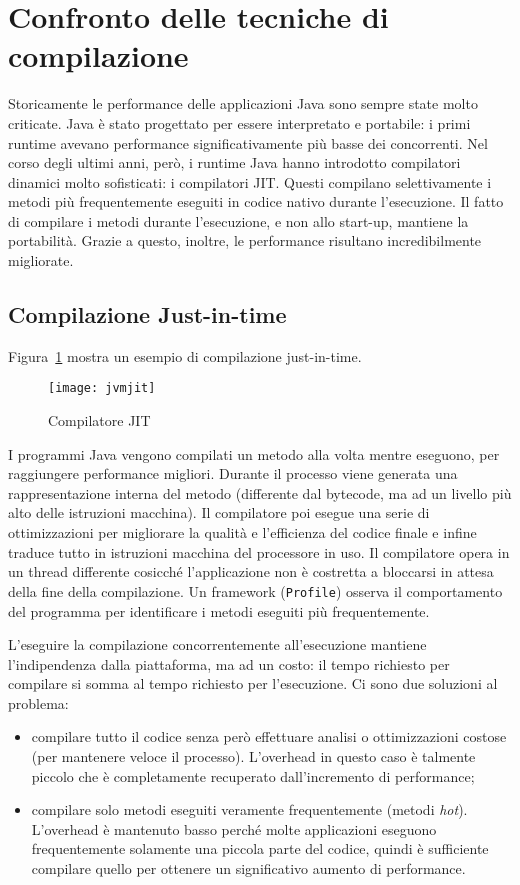 \section{Confronto delle tecniche di compilazione}
Storicamente le performance delle applicazioni Java sono sempre state molto criticate. Java è stato progettato per essere interpretato e portabile: i primi runtime avevano performance significativamente più basse dei concorrenti. Nel corso degli ultimi anni, però, i runtime Java hanno introdotto compilatori dinamici molto sofisticati: i compilatori JIT. Questi compilano selettivamente i metodi più frequentemente eseguiti in codice nativo durante l'esecuzione. Il fatto di compilare i metodi durante l'esecuzione, e non allo start-up, mantiene la portabilità. Grazie a questo, inoltre, le performance risultano incredibilmente migliorate. 

\subsection{Compilazione Just-in-time}
Figura~\ref{fig:jit} mostra un esempio di compilazione just-in-time. 
\begin{figure}[h]
	\centering
	\texttt{[image: jvmjit]}
	\caption[Compilatore JIT]{Compilatore JIT}
	\label{fig:jit}
\end{figure}
I programmi Java vengono compilati un metodo alla volta mentre eseguono, per raggiungere performance migliori. Durante il processo viene generata una rappresentazione interna del metodo (differente dal bytecode, ma ad un livello più alto delle istruzioni macchina). Il compilatore poi esegue una serie di ottimizzazioni per migliorare la qualità e l'efficienza del codice finale e infine traduce tutto in istruzioni macchina del processore in uso. Il compilatore opera in un thread differente cosicché l'applicazione non è costretta a bloccarsi in attesa della fine della compilazione. Un framework (\texttt{Profile}) osserva il comportamento del programma per identificare i metodi eseguiti più frequentemente. 

L'eseguire la compilazione concorrentemente all'esecuzione mantiene l'indipendenza dalla piattaforma, ma ad un costo: il tempo richiesto per compilare si somma al tempo richiesto per l'esecuzione. Ci sono due soluzioni al problema:
\begin{itemize}
	\item compilare tutto il codice senza però effettuare analisi o ottimizzazioni costose (per mantenere veloce il processo). L'overhead in questo caso è talmente piccolo che è completamente recuperato dall'incremento di performance; 
	\item compilare solo metodi eseguiti veramente frequentemente (metodi \textit{hot}). L'overhead è mantenuto basso perché molte applicazioni eseguono frequentemente solamente una piccola parte del codice, quindi è sufficiente compilare quello per ottenere un significativo aumento di performance.
\end{itemize}

